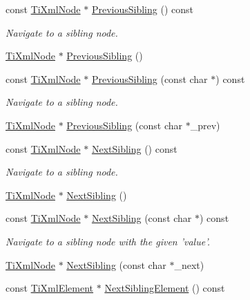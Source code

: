 \begin{DoxyCompactItemize}
const \hyperlink{class_ti_xml_node}{Ti\-Xml\-Node} $\ast$ \hyperlink{class_ti_xml_node_ac2cd892768726270e511b2ab32de4d10}{Previous\-Sibling} () const 
\begin{DoxyCompactList}\small\item\em Navigate to a sibling node. \end{DoxyCompactList}\item 
\hyperlink{class_ti_xml_node}{Ti\-Xml\-Node} $\ast$ \hyperlink{class_ti_xml_node_af8c0642ad6ecc03f62953e68896ed1cc}{Previous\-Sibling} ()
\item 
const \hyperlink{class_ti_xml_node}{Ti\-Xml\-Node} $\ast$ \hyperlink{class_ti_xml_node_a5bdd49327eec1e609b7d22af706b8316}{Previous\-Sibling} (const char $\ast$) const 
\begin{DoxyCompactList}\small\item\em Navigate to a sibling node. \end{DoxyCompactList}\item 
\hyperlink{class_ti_xml_node}{Ti\-Xml\-Node} $\ast$ \hyperlink{class_ti_xml_node_a6c977049207177ef21b51972315c2053}{Previous\-Sibling} (const char $\ast$\-\_\-prev)
\item 
const \hyperlink{class_ti_xml_node}{Ti\-Xml\-Node} $\ast$ \hyperlink{class_ti_xml_node_af854baeba384f5fe9859f5aee03b548e}{Next\-Sibling} () const 
\begin{DoxyCompactList}\small\item\em Navigate to a sibling node. \end{DoxyCompactList}\item 
\hyperlink{class_ti_xml_node}{Ti\-Xml\-Node} $\ast$ \hyperlink{class_ti_xml_node_a4d05f7b1d7b470ac6887edd072d4892a}{Next\-Sibling} ()
\item 
const \hyperlink{class_ti_xml_node}{Ti\-Xml\-Node} $\ast$ \hyperlink{class_ti_xml_node_a2e61c0b89a77e36a0e8c60490003cb46}{Next\-Sibling} (const char $\ast$) const 
\begin{DoxyCompactList}\small\item\em Navigate to a sibling node with the given 'value'. \end{DoxyCompactList}\item 
\hyperlink{class_ti_xml_node}{Ti\-Xml\-Node} $\ast$ \hyperlink{class_ti_xml_node_a4080bc5cc8a5c139e7cf308669e850fc}{Next\-Sibling} (const char $\ast$\-\_\-next)
\item 
const \hyperlink{class_ti_xml_element}{Ti\-Xml\-Element} $\ast$ \hyperlink{class_ti_xml_node_a73acf929d49d10bd0e5fb3d31b0372d1}{Next\-Sibling\-Element} () const 

\end{DoxyCompactItemize}
